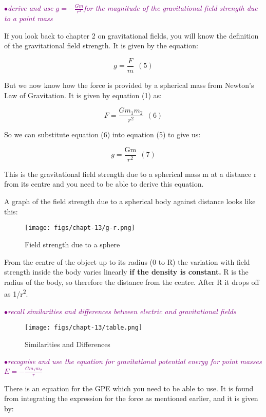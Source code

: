 \documentclass[a4paper,11pt,twoside]{memoir}
\newcounter{spec}[chapter]
\newcommand{\spec}[1]{\Needspace{5\baselineskip}\textcolor{purple}{$\bullet$\hspace{0.5cm}\textit{#1}}}
\begin{document}
\spec{derive and use $g = -\frac{Gm}{r^2}$for the magnitude of the gravitational field strength due to a point mass}

If you look back to chapter 2 on gravitational fields, you will know the
definition of the gravitational field strength. It is given by the
equation:

\[g = \frac{F}{m}\ \ (5)\]

But we now know how the force is provided by a spherical mass from
Newton's Law of Gravitation. It is given by equation (1) as:

\[F = \frac{Gm_{1}m_{2}}{r^{2}}\ \ (6)\]

So we can substitute equation (6) into equation (5) to give us:

\[g = \frac{\text{Gm}}{r^{2}}\ \ (7)\]

This is the gravitational field strength due to a spherical mass m at a
distance r from its centre and you need to be able to derive this
equation.

A graph of the field strength due to a spherical body against distance
looks like this:

\begin{figure}[h]
  \begin{center}
  \texttt{[image: figs/chapt-13/g-r.png]}
\end{center}
  \caption{Field strength due to a sphere}
  \label{}
\end{figure}

From the centre of the object up to its radius (0 to R) the variation
with field strength inside the body varies linearly \textbf{if the
density is constant.} R is the radius of the body, so therefore the
distance from the centre. After R it drops off as
1/r\textsuperscript{2}.

\spec{recall similarities and differences between electric and gravitational fields}

\begin{figure}[h]
  \texttt{[image: figs/chapt-13/table.png]}
  \caption{Similarities and Differences}
  \label{tab:sim}
\end{figure}

\spec{recognise and use the equation for gravitational potential energy for point masses $ E = - \frac{Gm_1m_2}{r}$}

There is an equation for the GPE which you need to be able to use. It is
found from integrating the expression for the force as mentioned
earlier, and it is given by:
\end{document}
